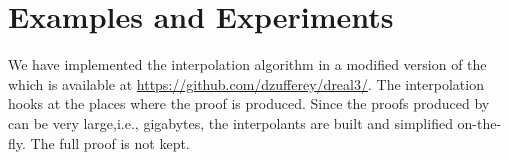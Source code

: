 \section{Examples and Experiments}
\label{sec:eval}

We have implemented the interpolation algorithm in a modified version of the \dReal which is available at \url{https://github.com/dzufferey/dreal3/}.
The interpolation hooks at the places where the proof is produced.
Since the proofs produced by \dReal can be very large,i.e., gigabytes, the interpolants are built and simplified on-the-fly.
The full proof is not kept.

